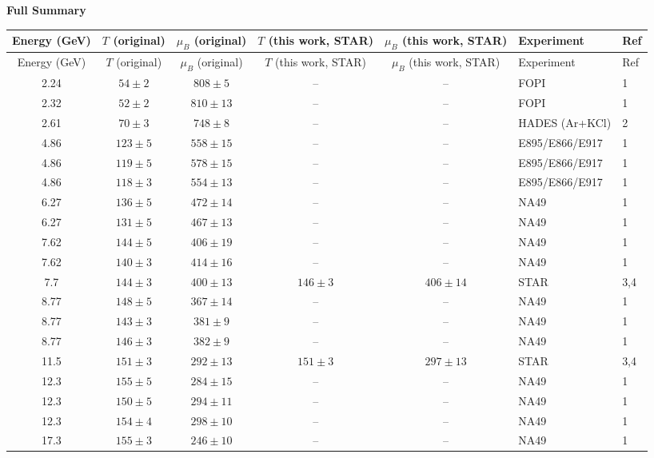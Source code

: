 \documentclass[10pt]{article}
\begin{document}
\clearpage
\vspace{0.1em}
\begin{center}
\normalsize
\textbf{Full Summary}
\end{center}
\small
\begin{longtable}{c c c c c l l}
\toprule
Energy (GeV) & $T$ (original) & $\mu_B$ (original) & $T$ (this work, STAR) & $\mu_B$ (this work, STAR) & Experiment & Ref \\
\midrule
\endfirsthead
\toprule
Energy (GeV) & $T$ (original) & $\mu_B$ (original) & $T$ (this work, STAR) & $\mu_B$ (this work, STAR) & Experiment & Ref \\
\midrule
\endhead
  2.24 & $54 \pm 2$ & $808 \pm 5$ & -- & -- & FOPI & 1 \\
  2.32 & $52 \pm 2$ & $810 \pm 13$ & -- & -- & FOPI & 1 \\
  2.61 & $70 \pm 3$ & $748 \pm 8$ & -- & -- & HADES (Ar+KCl) & 2 \\
  4.86 & $123 \pm 5$ & $558 \pm 15$ & -- & -- & E895/E866/E917 & 1 \\
  4.86 & $119 \pm 5$ & $578 \pm 15$ & -- & -- & E895/E866/E917 & 1 \\
  4.86 & $118 \pm 3$ & $554 \pm 13$ & -- & -- & E895/E866/E917 & 1 \\
  6.27 & $136 \pm 5$ & $472 \pm 14$ & -- & -- & NA49 & 1 \\
  6.27 & $131 \pm 5$ & $467 \pm 13$ & -- & -- & NA49 & 1 \\
  7.62 & $144 \pm 5$ & $406 \pm 19$ & -- & -- & NA49 & 1 \\
  7.62 & $140 \pm 3$ & $414 \pm 16$ & -- & -- & NA49 & 1 \\
  7.7 & $144 \pm 3$ & $400 \pm 13$ & $146 \pm 3$ & $406 \pm 14$ & STAR & 3,4 \\
  8.77 & $148 \pm 5$ & $367 \pm 14$ & -- & -- & NA49 & 1 \\
  8.77 & $143 \pm 3$ & $381 \pm 9$ & -- & -- & NA49 & 1 \\
  8.77 & $146 \pm 3$ & $382 \pm 9$ & -- & -- & NA49 & 1 \\
  11.5 & $151 \pm 3$ & $292 \pm 13$ & $151 \pm 3$ & $297 \pm 13$ & STAR & 3,4 \\
  12.3 & $155 \pm 5$ & $284 \pm 15$ & -- & -- & NA49 & 1 \\
  12.3 & $150 \pm 5$ & $294 \pm 11$ & -- & -- & NA49 & 1 \\
  12.3 & $154 \pm 4$ & $298 \pm 10$ & -- & -- & NA49 & 1 \\
  17.3 & $155 \pm 3$ & $246 \pm 10$ & -- & -- & NA49 & 1 \\

\end{longtable}
\end{document}
